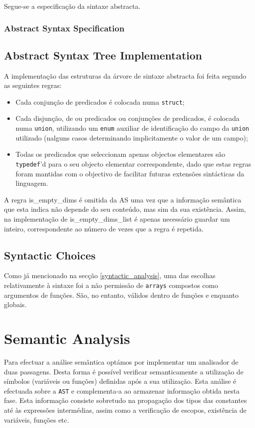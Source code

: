 \documentclass[a4paper]{article}
\begin{document}
Segue-se a especificação da sintaxe abstracta.

\cleardoublepage

\subsubsection{Abstract Syntax Specification}


\cleardoublepage

\subsection{Abstract Syntax Tree Implementation}
A implementação das estruturas da árvore de sintaxe abstracta foi feita segundo as seguintes regras:
\begin{itemize}
	\item Cada conjunção de predicados é colocada numa \texttt{struct};
	\item Cada disjunção, de ou predicados ou conjunções de predicados, é colocada numa \texttt{union},
		utilizando um \texttt{enum} auxiliar de identificação do campo da \texttt{union} utilizado
		(nalguns casos determinando implicitamente o valor de um campo);
	\item Todas os predicados que seleccionam apenas objectos elementares são \texttt{typedef}'d para o seu objecto elementar correspondente,
		dado que estas regras foram mantidas com o objectivo de facilitar futuras extensões sintácticas da linguagem.
\end{itemize}

A regra is\_empty\_dims é omitida da AS uma vez que a informação semântica que esta indica não depende do seu conteúdo, mas sim da sua existência.
Assim, na implementação de is\_empty\_dims\_list é apenas necessário guardar um inteiro, correspondente ao número de vezes que a regra é repetida.

\subsection{Syntactic Choices}
\indent \indent Como já mencionado na secção \ref{syntactic_analysis}, uma das escolhas relativamente à sintaxe foi a não permissão de \texttt{arrays} compostos
como argumentos de funções. São, no entanto, válidos dentro de funções e enquanto globais.

\cleardoublepage
\section{Semantic Analysis}
\indent \indent Para efectuar a análise semântica optámos por implementar um analisador de duas passagens. Desta forma
é possível verificar semanticamente a utilização de símbolos (variáveis ou funções) definidas após a sua utilização. Esta
análise é efectuada sobre a \texttt{AST} e complementa-a ao armazenar informação obtida nesta fase. Esta informação
consiste sobretudo na propagação dos tipos das constantes até às expressões intermédias, assim como a verificação
de escopos, existência de variáveis, funções etc.
\end{document}
